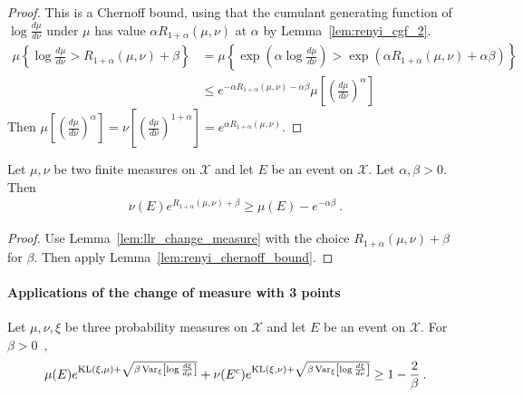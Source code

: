 \begin{proof}\leanok
{}
This is a Chernoff bound, using that the cumulant generating function of $\log\frac{d\mu}{d\nu}$ under $\mu$ has value $\alpha R_{1+\alpha}(\mu, \nu)$ at $\alpha$ by Lemma~\ref{lem:renyi_cgf_2}.
\begin{align*}
\mu\left\{ \log\frac{d \mu}{d \nu} > R_{1+\alpha}(\mu, \nu) + \beta \right\}
&= \mu\left\{ \exp\left(\alpha\log\frac{d \mu}{d \nu}\right) > \exp\left(\alpha R_{1+\alpha}(\mu, \nu) + \alpha \beta\right) \right\}
\\
&\le e^{-\alpha R_{1+\alpha}(\mu, \nu) - \alpha \beta} \mu\left[\left(\frac{d \mu}{d \nu}\right)^\alpha \right]
\end{align*}
Then $\mu\left[\left(\frac{d \mu}{d \nu}\right)^\alpha \right] = \nu\left[\left(\frac{d \mu}{d \nu}\right)^{1+\alpha} \right] = e^{\alpha R_{1+\alpha}(\mu, \nu)}$.
\end{proof}

\begin{lemma}
  \label{lem:renyi_change_measure}
  \leanok
  Let $\mu, \nu$ be two finite measures on $\mathcal X$ and let $E$ be an event on $\mathcal X$. Let $\alpha,\beta > 0$. Then
  \begin{align*}
  \nu(E) e^{R_{1+\alpha}(\mu, \nu) + \beta} \ge \mu(E) - e^{-\alpha \beta} \: .
  \end{align*}
\end{lemma}

\begin{proof}\leanok
{}
Use Lemma~\ref{lem:llr_change_measure} with the choice $R_{1+\alpha}(\mu, \nu) + \beta$ for $\beta$. Then apply Lemma~\ref{lem:renyi_chernoff_bound}.
\end{proof}



\paragraph{Applications of the change of measure with 3 points}

\begin{lemma}
  \label{lem:change_measure_variance_add}
  \uses{}
  Let $\mu, \nu, \xi$ be three probability measures on $\mathcal X$ and let $E$ be an event on $\mathcal X$. For $\beta > 0$~,
  \begin{align*}
  \mu(E) e^{\operatorname{KL}(\xi, \mu) + \sqrt{\beta \operatorname{Var}_{\xi}\left[\log\frac{d\xi}{d\mu}\right]}} + \nu(E^c) e^{\operatorname{KL}(\xi, \nu) + \sqrt{\beta \operatorname{Var}_{\xi}\left[\log\frac{d\xi}{d\nu}\right]}}
  \ge 1 - \frac{2}{\beta} \: .
  \end{align*}
\end{lemma}

